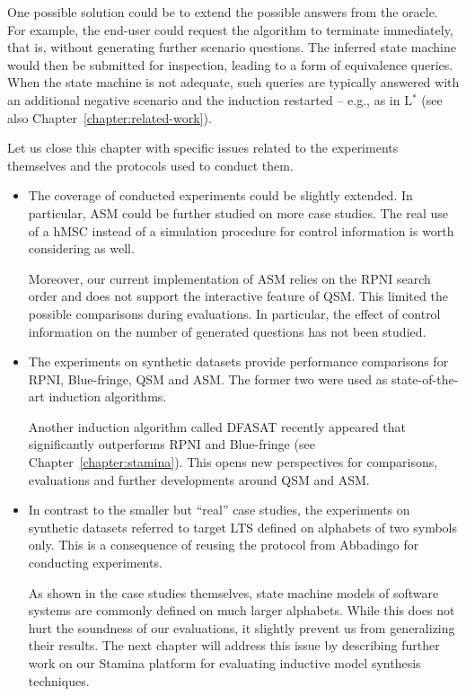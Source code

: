 \begin{itemize}
One possible solution could be to extend the possible answers from the oracle. For example, the end-user could request  the algorithm to terminate immediately, that is, without generating further scenario questions. The inferred state machine would then be submitted for inspection, leading to a form of equivalence queries. When the state machine is not adequate, such queries are typically answered with an additional negative scenario and the induction restarted -- e.g., as in L$^*$ \cite{Angluin:1987} (see also Chapter~\ref{chapter:related-work}).

\end{itemize}

Let us close this chapter with specific issues related to the experiments themselves and the protocols used to conduct them. 
\begin{itemize}

\item The coverage of conducted experiments could be slightly extended. In particular, ASM could be further studied on more case studies. The real use of a hMSC instead of a simulation procedure for control information is worth considering as well.

Moreover, our current implementation of ASM relies on the RPNI search order and does not support the interactive feature of QSM. This limited the possible comparisons during evaluations. In particular, the effect of control information on the number of generated questions has not been studied.

\item The experiments on synthetic datasets provide performance comparisons for RPNI, Blue-fringe, QSM and ASM. The former two were used as state-of-the-art induction algorithms. 

Another induction algorithm called DFASAT recently appeared that significantly outperforms RPNI and Blue-fringe \cite{Heule:2010} (see Chapter~\ref{chapter:stamina}). This opens new perspectives for comparisons, evaluations and further developments around QSM and ASM. 

\item In contrast to the smaller but ``real'' case studies, the experiments on synthetic datasets referred to target LTS defined on alphabets of two symbols only. This is a consequence of reusing the protocol from Abbadingo for conducting experiments. 

As shown in the case studies themselves, state machine models of software systems are commonly defined on much larger alphabets. While this does not hurt the soundness of our evaluations, it slightly prevent us from generalizing their results. The next chapter will address this issue by describing further work on our Stamina platform for evaluating inductive model synthesis techniques.
\end{itemize}
